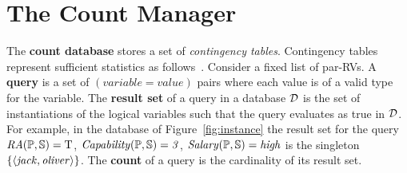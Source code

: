 
\section{The Count Manager} 




The \textbf{count database} \CDB stores a set of  {\em contingency tables}. Contingency tables represent sufficient statistics as follows~\cite{Moore1998}. 
Consider a fixed list of par-RVs.
A \textbf{query} is a set of $(variable = value)$ pairs where each value is of a valid type for the variable. 
The \textbf{result set} of a query in a database $\D$ is the set of instantiations of the logical variables such that the query evaluates as true in $\D$.
For example, in the database of Figure~\ref{fig:instance} the result set for the query 
$\it{RA}(\P,\S) = \true$, $\it{Capability}(\P,\S) = 3$, $\it{Salary}(\P,\S) = \it{high} $ is
the singleton $\{\langle \it{jack}, \it{oliver}\rangle\}$. 
The \textbf{count} of a query is the cardinality of its result set. 

